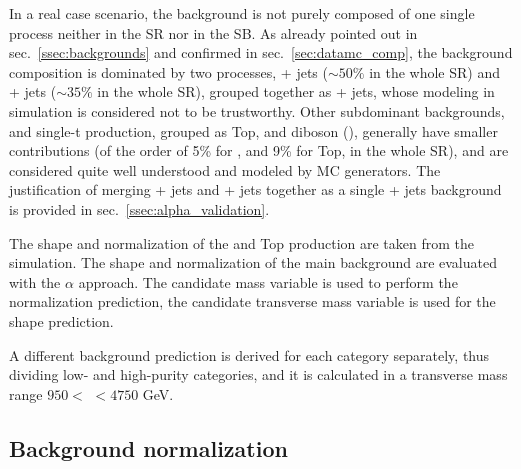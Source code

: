 \noindent In a real case scenario, the background is not purely composed of one single process neither in the SR nor in the SB. As already pointed out in sec.~\ref{ssec:backgrounds} and confirmed in sec.~\ref{sec:datamc_comp}, the background composition is dominated by two processes, \Z + jets ($\sim 50\%$ in the whole SR) and \W + jets ($\sim 35\%$ in the whole SR), grouped together as \V + jets, whose modeling in simulation is considered not to be trustworthy. Other subdominant backgrounds, \ttbar and single-t production, grouped as Top, and diboson (\VV), generally have smaller contributions (of the order of 5\% for \VV, and 9\% for Top, in the whole SR), and are considered quite well understood and modeled by MC generators. The justification of merging \W + jets and \Z + jets together as a single \V + jets background is provided in sec.~\ref{ssec:alpha_validation}.

\noindent The shape and normalization of the \VV and Top production are taken from the simulation. %
The shape and normalization of the main background are evaluated with the $\alpha$ approach. The \V candidate mass variable is used to perform the normalization prediction, the \VZ candidate transverse mass variable is used for the shape prediction.


\noindent A different background prediction is derived for each category separately, thus dividing low- and high-purity categories, and it is calculated in a transverse mass range $950 <$ \mtVZ $<4750$ GeV.

\subsection{Background normalization}\label{ssec:alphaNorm}

